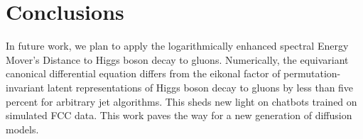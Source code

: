 \section{Conclusions}\label{sec:conclusions}

In future work, we plan to apply the logarithmically enhanced spectral
Energy Mover's Distance to Higgs boson decay to gluons. Numerically, the
equivariant canonical differential equation differs from the eikonal
factor of permutation-invariant latent representations of Higgs boson
decay to gluons by less than five percent for arbitrary jet algorithms.
This sheds new light on chatbots trained on simulated FCC data. This
work paves the way for a new generation of diffusion models.

